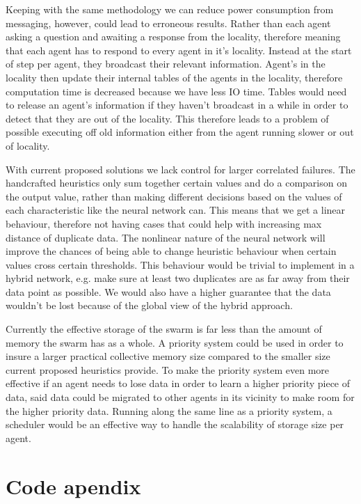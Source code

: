 \documentclass{UoYCSproject}
\begin{document}
Keeping with the same methodology we can reduce power consumption from messaging, however, could lead to erroneous results. 
Rather than each agent asking a question and awaiting a response from the locality, therefore meaning that each agent has to respond to every agent in it’s locality. 
Instead at the start of step per agent, they broadcast their relevant information. 
Agent’s in the locality then update their internal tables of the agents in the locality, therefore computation time is decreased because we have less IO time. 
Tables would need to release an agent's information if they haven’t broadcast in a while in order to detect that they are out of the locality. 
This therefore leads to a problem of possible executing off old information either from the agent running slower or out of locality.

With current proposed solutions we lack control for larger correlated failures. 
The handcrafted heuristics only sum together certain values and do a comparison on the output value, rather than making different decisions based on the values of each characteristic like the neural network can. 
This means that we get a linear behaviour, therefore not having cases that could help with increasing max distance of duplicate data. 
The nonlinear nature of the neural network will improve the chances of being able to change heuristic behaviour when certain values cross certain thresholds. 
This behaviour would be trivial to implement in a hybrid network, e.g. make sure at least two duplicates are as far away from their data point as possible. 
We would also have a higher guarantee that the data wouldn’t be lost because of the global view of the hybrid approach.

Currently the effective storage of the swarm is far less than the amount of memory the swarm has as a whole. 
A priority system could be used in order to insure a larger practical collective memory size compared to the smaller size current proposed heuristics provide. 
To make the priority system even more effective if an agent needs to lose data in order to learn a higher priority piece of data, said data could be migrated to other agents in its vicinity to make room for the higher priority data. 
Running along the same line as a priority system, a scheduler would be an effective way to handle the scalability of storage size per agent.




\appendix
\chapter{Code apendix}
\end{document}
